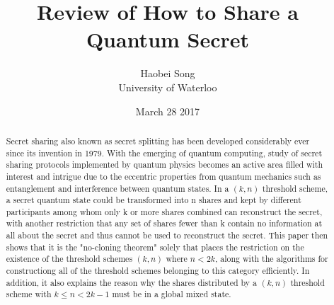 \documentclass[12pt]{article}
\title{\textbf{Review of How to Share a Quantum Secret \cite{review}}} \author{Haobei Song\\University of Waterloo}
\date{March 28 2017}
\begin{document}
 

\maketitle
\newpage


\begin{abstract}
	Secret sharing also known as secret splitting has been developed considerably ever since its invention in 1979. With the emerging of quantum computing, study of secret sharing protocols implemented by quantum physics becomes an active area filled with interest and intrigue due to the eccentric properties from quantum mechanics such as entanglement and interference between quantum states.
	In a $(k,n)$ threshold scheme, a secret quantum state could be transformed into n shares and kept by different participants among whom only k or more shares combined can reconstruct the secret, with another restriction that any set of shares fewer than k contain no information at all about the secret and thus cannot be used to reconstruct the secret.
	This paper then shows that it is the "no-cloning theorem" solely that places the restriction on the existence of the threshold schemes $(k, n)$ where $n < 2k$, along with the algorithms for constructiong all of the threshold schemes belonging to this category efficiently. In addition, it also explains the reason why the shares distributed by a $(k,n)$ threshold scheme with $k \leq n < 2k-1$ must be in a global mixed state.
	
\end{abstract}
\end{document}
